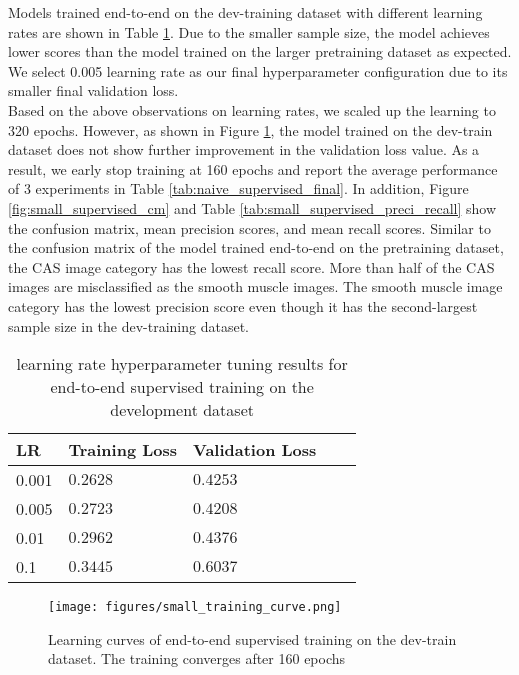 \documentclass[12pt,twoside]{report}
\begin{document}
Models trained end-to-end on the dev-training dataset with different learning rates are shown in Table \ref{tab:small_supervised_tuning}. Due to the smaller sample size, the model achieves lower scores than the model trained on the larger pretraining dataset as expected. We select 0.005 learning rate as our final hyperparameter configuration due to its smaller final validation loss. \\

Based on the above observations on learning rates, we scaled up the learning to 320 epochs. However, as shown in Figure \ref{fig:small_training_curve}, the model trained on the dev-train dataset does not show further improvement in the validation loss value. As a result, we early stop training at 160 epochs and report the average performance of 3 experiments in Table \ref{tab:naive_supervised_final}. In addition, Figure \ref{fig:small_supervised_cm} and Table \ref{tab:small_supervised_preci_recall} show the confusion matrix, mean precision scores, and mean recall scores. Similar to the confusion matrix of the model trained end-to-end on the pretraining dataset, the CAS image category has the lowest recall score. More than half of the CAS images are misclassified as the smooth muscle images. The smooth muscle image category has the lowest precision score even though it has the second-largest sample size in the dev-training dataset. \\

\begin{table}[]
    \centering
    \begin{tabular}{lllll}
    \toprule
    LR & Training Loss & Validation Loss \\
    \midrule
    0.001 & $0.2628$ & $0.4253$ \\
    0.005 & $0.2723$ & $0.4208$ \\
    0.01  & $0.2962$ & $0.4376$ \\
    0.1   & $0.3445$ & $0.6037$ \\
    \bottomrule
    \end{tabular}
    \caption{learning rate hyperparameter tuning results for end-to-end supervised training on the development dataset}
    \label{tab:small_supervised_tuning}
\end{table}

\begin{figure}
    \centering
    \texttt{[image: figures/small\_training\_curve.png]}
    \caption{Learning curves of end-to-end supervised training on the dev-train dataset. The training converges after 160 epochs}
    \label{fig:small_training_curve}
\end{figure}
\end{document}

